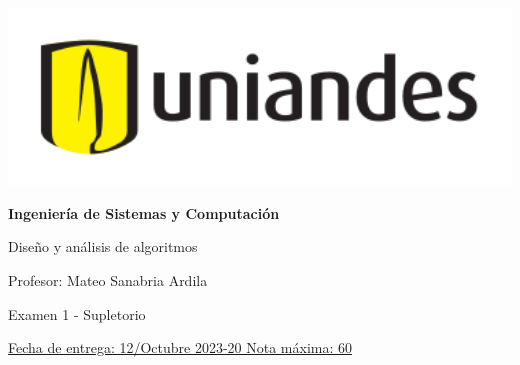 \documentclass[12pt, a4paper]{exam}
\begin{document}
	\noindent
	\begin{minipage}[l]{0.1\textwidth}
		\noindent
		\includegraphics[width=1.8\textwidth]{Logosimbolo-uniandes_horizontal.png}
	\end{minipage}
\hfill
\begin{minipage}[c]{0.8\textwidth}
	\begin{center}
		{\large \textbf{Ingeniería de Sistemas y Computación} \par
		\large	Diseño y análisis de algoritmos	\par
		\small  Profesor: Mateo Sanabria Ardila	\par
		\small  Examen 1 - Supletorio	\par
		}
	\end{center}
\end{minipage}
\par
\vspace{0.2in}
\noindent
\uline{Fecha de entrega: 12/Octubre 	\hfill  2023-20		\hfill Nota máxima: 60}
\par 
\vspace{0.15in}
\end{document}
